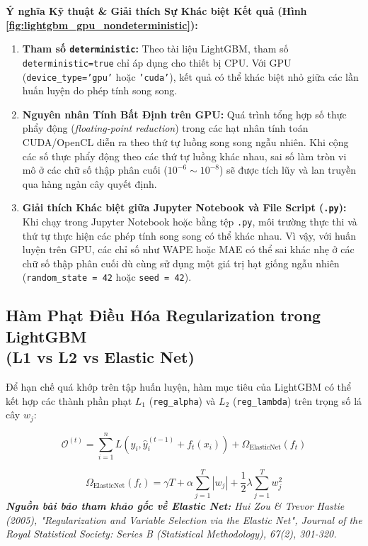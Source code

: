 \documentclass[12pt,a4paper]{article}
\begin{document}
\textbf{Ý nghĩa Kỹ thuật \& Giải thích Sự Khác biệt Kết quả (Hình \ref{fig:lightgbm_gpu_nondeterministic}):}
\begin{enumerate}
    \item \textbf{Tham số \texttt{deterministic}:} Theo tài liệu LightGBM, tham số \texttt{deterministic=true} chỉ áp dụng cho thiết bị CPU. Với GPU (\texttt{device\_type='gpu'} hoặc \texttt{'cuda'}), kết quả có thể khác biệt nhỏ giữa các lần huấn luyện do phép tính song song.
    \item \textbf{Nguyên nhân Tính Bất Định trên GPU:} Quá trình tổng hợp số thực phẩy động (\textit{floating-point reduction}) trong các hạt nhân tính toán CUDA/OpenCL diễn ra theo thứ tự luồng song song ngẫu nhiên. Khi cộng các số thực phẩy động theo các thứ tự luồng khác nhau, sai số làm tròn vi mô ở các chữ số thập phân cuối ($10^{-6} \sim 10^{-8}$) sẽ được tích lũy và lan truyền qua hàng ngàn cây quyết định.
    \item \textbf{Giải thích Khác biệt giữa Jupyter Notebook và File Script (\texttt{.py}):} 
    Khi chạy trong Jupyter Notebook hoặc bằng tệp \texttt{.py}, môi trường thực thi và thứ tự thực hiện các phép tính song song có thể khác nhau. Vì vậy, với huấn luyện trên GPU, các chỉ số như WAPE hoặc MAE có thể sai khác nhẹ ở các chữ số thập phân cuối dù cùng sử dụng một giá trị hạt giống ngẫu nhiên (\texttt{random\_state = 42} hoặc \texttt{seed = 42}).
\end{enumerate}

\subsection[Hàm Phạt Điều Hóa Regularization]{Hàm Phạt Điều Hóa Regularization trong LightGBM\\(L1 vs L2 vs Elastic Net)~\cite{zou2005elasticnet}}
Để hạn chế quá khớp trên tập huấn luyện, hàm mục tiêu của LightGBM có thể kết hợp các thành phần phạt $L_1$ (\texttt{reg\_alpha}) và $L_2$ (\texttt{reg\_lambda}) trên trọng số lá cây $w_j$:

\begin{equation}
    \mathcal{O}^{(t)} = \sum_{i=1}^{n} L\left(y_i, \hat{y}_i^{(t-1)} + f_t(x_i)\right) + \Omega_{\text{ElasticNet}}(f_t)
\end{equation}

\begin{equation}
    \Omega_{\text{ElasticNet}}(f_t) = \gamma T + \alpha \sum_{j=1}^{T} |w_j| + \frac{1}{2} \lambda \sum_{j=1}^{T} w_j^2
\end{equation}
\textit{\textbf{Nguồn bài báo tham khảo gốc về Elastic Net:} Hui Zou \& Trevor Hastie (2005), "Regularization and Variable Selection via the Elastic Net", Journal of the Royal Statistical Society: Series B (Statistical Methodology), 67(2), 301-320.}
\end{document}
